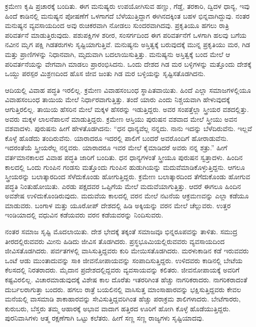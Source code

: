 \vskip 6pt

ಕ್ರಮೇಣ ಕೃಷಿ ಪ್ರಚಾರಕ್ಕೆ ಬಂದಿತು. ಈಗ ಮನುಷ್ಯರು ಉಪಯೋಗಿಸುವ ಹಣ್ಣು, ಗೆಡ್ಡೆ, ತರಕಾರಿ, ದ್ವಿದಳ ಧಾನ್ಯ, ಇವು ಹಿಂದೆ ಕಾಡಿನಲ್ಲಿ ಮನುಷ್ಯನ ಪೋಷಣೆಗೆ ಒಳಗಾಗದೆ ಬೆಳೆಯುತ್ತಿದ್ದಾಗ ಈಗಿನದಕ್ಕಿಂತ ಬಹಳ ಭಿನ್ನವಾಗಿದ್ದುವು. ನಂತರ ಮನುಷ್ಯನ ವ್ಯವಸಾಯದಿಂದ ಅವು ರುಚಿಕರವಾಗಿ ನೋಡಲು ಸುಂದರವಾಗಿದವು. ಪ್ರಕೃತಿಯೂ ಹಗಲು ರಾತ್ರಿ ಪರಿವರ್ತನೆ ಮಾಡುತ್ತಿರುವುದು. ಪಶುಪಕ್ಷಿಗಳ ಶರೀರ, ಸಂಸರ್ಗದಿಂದ ಈಗ ಪರಿವರ್ತನೆಗೆ ಒಳಗಾಗಿ ಹಲವು ಬಗೆಯ ನವೀನ ಮೃಗ ಪಕ್ಷಿ ಗಿಡತರುಗಳು ಸೃಷ್ಟಿಯಾಗುತ್ತಿವೆ. ಮನುಷ್ಯನು ಅಸ್ತಿತ್ವಕ್ಕೆ ಬರುವುದಕ್ಕೆ ಮುನ್ನ ಪ್ರಕೃತಿಯು ಮರ, ಗಿಡ ಮತ್ತು ಪ್ರಾಣಿಗಳನ್ನು ನಿಧಾನವಾಗಿ, ಮೃದುವಾಗಿ ಬದಲಾಯಿಸುತ್ತಿತ್ತು. ಮನುಷ್ಯನು ಅಸ್ತಿತ್ವಕ್ಕೆ ಬಂದ ಮೇಲೆ ಆ ಪರಿವರ್ತನೆಯನ್ನು ವೇಗವಾಗಿ ಮಾಡಲು ಪ್ರಾರಂಭಿಸಿದನು. ಒಂದು ದೇಶದ ಗಿಡ ಮರ ಬಳ್ಳಿಗಳನ್ನು ಮತ್ತೊಂದು ದೇಶಕ್ಕೆ ಒಯ್ದು ಪರಸ್ಪರ ಮಿಶ್ರಣದಿಂದ ಹೊಸ ಜೀವ ಜಂತು ಗಿಡ ಮರ ಬಳ್ಳಿಯನ್ನು ಸೃಷ್ಟಿಸತೊಡಗಿದನು.

\vskip 6pt

ಆದಿಯಲ್ಲಿ ವಿವಾಹ ಪದ್ಧತಿ ಇರಲಿಲ್ಲ. ಕ್ರಮೇಣ ವಿವಾಹಸಂಬಂಧ ಸ್ಥಾಪಿತವಾಯಿತು. ಹಿಂದೆ ಎಲ್ಲಾ ಸಮಾಜಗಳಲ್ಲಿಯೂ ವಿವಾಹಸಂಬಂಧ ತಾಯಿಯ ಮೇಲೆ ನಿರ್ಧಾರವಾಗುತ್ತಿತ್ತು. ತಂದೆ ಯಾರು ಎಂದು ನಿಶ್ಚಯವಾಗಿ ಹೇಳುವುದಕ್ಕೆ ಆಗುತ್ತಿರಲಿಲ್ಲ. ತಾಯಿಯ ಹೆಸರಿನ ಮೇಲೆ ಮಕ್ಕಳ ಹೆಸರನ್ನು ಇಡುತ್ತಿದ್ದರು. ಅವರ ಸಂಪತ್ತೆಲ್ಲಾ ಸ್ತ್ರೀಯರ ವಶದಲ್ಲಿತ್ತು. ಅವರು ಮಕ್ಕಳ ಲಾಲನೆಪಾಲನೆ ಮಾಡುತ್ತಿದ್ದರು. ಕ್ರಮೇಣ ಆಸ್ತಿಯು ಪುರುಷನ ವಶವಾದ ಮೇಲೆ ಸ್ತ್ರೀಯು ಅವನ ವಶವಾದಳು. ಪುರುಷನು ಹೀಗೆ ಹೇಳತೊಡಗಿದನು: “ಧನ ಧಾನ್ಯವೆಲ್ಲ ನನ್ನದು. ನಾನು ಇದನ್ನು ಬೆಳೆದಿರುವೆನು. ಇಲ್ಲವೆ ಕೊಳ್ಳೆ ಹೊಡೆದು ತಂದಿರುವೆನು. ಯಾರಾದರೂ ಇದರಲ್ಲಿ ಪಾಲಿಗೆ ಬಂದರೆ ಅವರೊಂದಿಗೆ ಹೋರಾಡುವೆನು. ಇದರಂತೆಯೆ ಸ್ತ್ರೀಯರೆಲ್ಲ ನನ್ನವರು. ಯಾರಾದರೂ ಇವರ ಮೇಲೆ ಕೈಮಾಡಿದರೆ ಅವರು ನನ್ನ ಶತ್ರು.” ಹೀಗೆ ವರ್ತಮಾನಕಾಲದ ವಿವಾಹ ಪದ್ಧತಿ ಜಾರಿಗೆ ಬಂದಿತು. ಧನ ಧಾನ್ಯಗಳಂತೆ ಸ್ತ್ರೀಯೂ ಪುರುಷನ ಸ್ವತ್ತಾದಳು. ಹಿಂದಿನ ಕಾಲದಲ್ಲಿ ಒಂದು ಗುಂಪಿನ ಗಂಡಸು ಮತ್ತೊಂದು ಗುಂಪಿನ ಹುಡುಗಿಯನ್ನು ಮದುವೆಮಾಡಿಕೊಳ್ಳುತ್ತಿದ್ದನು. ಆಗಲೂ ಸ್ತ್ರೀಯರನ್ನು ಬಲಾತ್ಕಾರದಿಂದ ಸೆಳೆದುಕೊಂಡು ಹೋಗುತ್ತಿದ್ದರು. ಕ್ರಮೇಣ ಬಲಾತ್ಕಾರದಿಂದ ತೆಗೆದುಕೊಂಡು ಹೋಗುವ ಪದ್ಧತಿ ನಿಂತುಹೋಯಿತು. ಎರಡು ಪಕ್ಷದವರ ಒಪ್ಪಿಗೆಯ ಮೇಲೆ ಮದುವೆಯಾಗುತ್ತಿತ್ತು. ಆದರೆ ಈಗಲೂ ಹಿಂದಿನ ಅವಶೇಷ ಉಳಿದುಕೊಂಡಿರುವುದು. ಮದುವೆಯ ಕಾಲದಲ್ಲಿ ವರನ ಮೇಲೆ ನಟನೆಯ ಆಕ್ರಮಣವನ್ನು ಎಲ್ಲಾ ಕಡೆಯೂ ಮಾಡುವರು. ಬಂಗಾಳ ಮತ್ತು ಯೂರೋಪ್​ ದೇಶದಲ್ಲಿ ಹಿಡಿ ಅಕ್ಕಿಯನ್ನು ವರನ ಮೇಲೆ ಚೆಲ್ಲುವರು. ಉತ್ತರ ಇಂಡಿಯಾದಲ್ಲಿ ವಧುವಿನ ಕಡೆಯವರು ವರನ ಕಡೆಯವರನ್ನು ನಿಂದಿಸುವರು.

\vskip 5pt

ನಂತರ ಸಮಾಜ ಸೃಷ್ಟಿ ಮೊದಲಾಯಿತು. ದೇಶ ಭೇದಕ್ಕೆ ತಕ್ಕಂತೆ ಸಮಾಜವೂ ಭಿನ್ನರೂಪವನ್ನು ತಾಳಿತು. ಸಮುದ್ರ ತೀರದಲ್ಲಿರುವವರು ಮೀನು ಹಿಡಿದು ಜೀವಿಸ ತೊಡಗಿದರು. ಪ್ರಸ್ಥಭೂಮಿಯಲ್ಲಿರುವವರು ವ್ಯವಸಾಯದಿಂದ ಜೀವಿಸತೊಡಗಿದರು. ಪರ್ವತಗಳಲ್ಲಿ ವಾಸಿಸುತ್ತಿದ್ದವರು ಕುರಿ ಮೇಯಿಸತೊಡಗಿದರು. ಮರಳುಕಾಡಿನ ಕಡೆ ಇರುವವರು ಒಂಟೆ ಆಡು ಮುಂತಾದುವನ್ನು ಸಾಕಿ ಜೀವನೋಪಾಯವನ್ನು ಸಂಪಾದಿಸುತ್ತಿದ್ದರು. ಉಳಿದವರು ಕಾಡಿನಲ್ಲಿ ಬೇಟೆಯ ಕೆಲಸದಲ್ಲಿ ನಿರತರಾದರು. ಮೈದಾನ ಪ್ರದೇಶದಲ್ಲಿದ್ದವರು ವ್ಯವಸಾಯವನ್ನು ಕಲಿತರು. ಜೀವನೋಪಾಯಕ್ಕೆ ಅವರಿಗೆ ಕಷ್ಟವಿರಲಿಲ್ಲ. ವಿಚಾರಮಾಡುವು\break ದಕ್ಕೆ ವಿಶೇಷ ಕಾಲ ದೊರೆತು ಇತರರಿಗಿಂತ ಹೆಚ್ಚು ನಾಗರಿಕರಾದರು. ನಾಗರಿಕರಾದಂತೆ ದುರ್ಬಲರಾಗುತ್ತಾ ಬಂದರು. ಹಗಲು ರಾತ್ರೆ ಬಯಲಿನಲ್ಲಿ ವಾಸಿಸುತ್ತ ಮಾಂಸಾಹಾರವನ್ನು ಭಕ್ಷಿಸುತ್ತಿದ್ದವರು ಕೇವಲ ಮನೆಯಲ್ಲಿ ವಾಸಮಾಡಿ ಶಾಕಾಹಾರವನ್ನು ಸೇವಿಸುತ್ತಿದ್ದವರಿಗಿಂತ ಹೆಚ್ಚು ಪರಾಕ್ರಮ ಶಾಲಿಗಳಾದರು. ಬೇಟೆಗಾರರು, ಕುರುಬರು, ಬೆಸ್ತರು ತಮ್ಮ ಆಹಾರಕ್ಕೆ ಅಭಾವ ವಾದಾಗ ಹತ್ತಿರದ ಊರಿಗೆ ಹೋಗಿ ಕೊಳ್ಳೆ ಹೊಡೆಯುತ್ತಿದ್ದರು. ಪುರನಿವಾಸಿಗಳು ಆತ್ಮ ರಕ್ಷಣೆಗಾಗಿ ಒಟ್ಟು ಕಲೆತರು. ಹೀಗೆ ಸಣ್ಣ ಸಣ್ಣ ರಾಜ್ಯಗಳು ಸೃಷ್ಟಿಯಾದವು.

